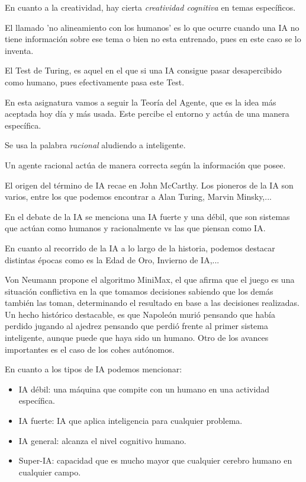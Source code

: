 En cuanto a la creatividad, hay cierta\textit{ creatividad cognitiva }en temas específicos.

El llamado 'no alineamiento con los humanos' es lo que ocurre cuando una IA no tiene información sobre ese tema o bien no esta entrenado, pues en este caso se lo inventa.

El Test de Turing, es aquel en el que si una IA consigue pasar desapercibido como humano, pues efectivamente pasa este Test.

En esta asignatura vamos a seguir la Teoría del Agente, que es la idea más aceptada hoy día y más usada. Este percibe el entorno y actúa de una manera específica. 

Se usa la palabra \textit{racional} aludiendo a inteligente.

Un agente racional actúa de manera correcta según la información que posee.

El origen del término de IA recae en John McCarthy. Los pioneros de la IA son varios, entre los que podemos encontrar a Alan Turing, Marvin Minsky,...

En el debate de la IA se menciona una IA fuerte y una débil, que son sistemas que actúan como humanos y racionalmente vs las que piensan como IA.

En cuanto al recorrido de la IA a lo largo de la historia, podemos destacar distintas épocas como es la Edad de Oro, Invierno de IA,...

Von Neumann propone el algoritmo MiniMax, el que afirma que el juego es una situación conflictiva en la que tomamos decisiones sabiendo que los demás también las toman, determinando el resultado en base a las decisiones realizadas.
Un hecho histórico destacable, es que Napoleón murió pensando que había perdido jugando al ajedrez pensando que perdió frente al primer sistema inteligente, aunque puede que haya sido un humano. 
Otro de los avances importantes es el caso de los cohes autónomos.

En cuanto a los tipos de IA podemos mencionar:

\begin{itemize}
    \item IA débil: una máquina que compite con un humano en una actividad específica.
    \item IA fuerte: IA que aplica inteligencia para cualquier problema.
    \item IA general: alcanza el nivel cognitivo humano.
    \item Super-IA: capacidad que es mucho mayor que cualquier cerebro humano en cualquier campo.
\end{itemize}